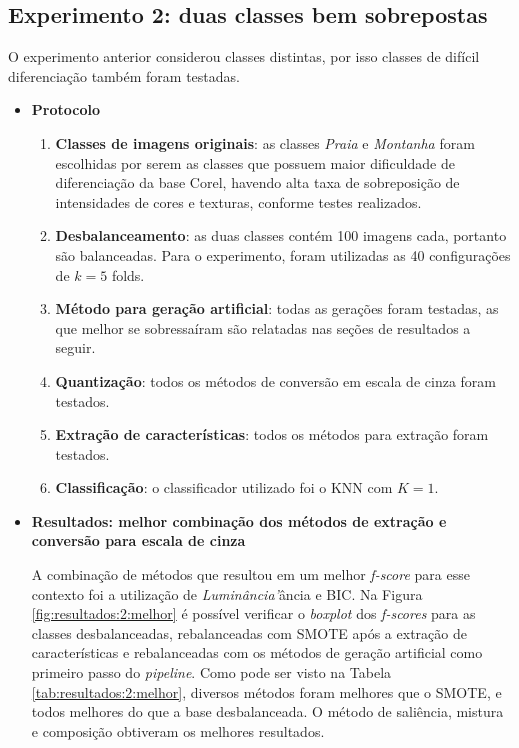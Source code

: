 \FloatBarrier
\subsection{Experimento 2: duas classes bem sobrepostas}

O experimento anterior considerou classes distintas, por isso classes de difícil diferenciação também foram testadas.

\begin{itemize}
\item[] \textbf{Protocolo}
\begin{enumerate}
\item \textbf{Classes de imagens originais}: as classes \textit{Praia} e \emph{Montanha} foram escolhidas por serem as classes que possuem maior dificuldade de diferenciação da base Corel, havendo alta taxa de sobreposição de intensidades de cores e texturas, conforme testes realizados.

\item \textbf{Desbalanceamento}: as duas classes contém 100 imagens cada, portanto são balanceadas. Para o experimento, foram utilizadas as 40 configurações de $k=5$ folds.

\item \textbf{Método para geração artificial}: todas as gerações foram testadas, as que melhor se sobressaíram são relatadas nas seções de resultados a seguir.

\item \textbf{Quantização}: todos os métodos de conversão em escala de cinza foram testados.

\item \textbf{Extração de características}: todos os métodos para extração foram testados.

\item \textbf{Classificação}: o classificador utilizado foi o KNN com $K=1$.
\end{enumerate}

\item[] \textbf{Resultados: melhor combinação dos métodos de extração e conversão para escala de cinza}

A combinação de métodos que resultou em um melhor \textit{f-score} para esse contexto foi a utilização de \emph{Luminância'}ância e BIC. Na Figura \ref{fig:resultados:2:melhor} é possível verificar o \textit{boxplot} dos \textit{f-scores} para as classes desbalanceadas, rebalanceadas com SMOTE após a extração de características e rebalanceadas com os métodos de geração artificial como primeiro passo do \textit{pipeline}. Como pode ser visto na Tabela \ref{tab:resultados:2:melhor}, diversos métodos foram melhores que o SMOTE, e todos melhores do que a base desbalanceada. O método de saliência, mistura e composição obtiveram os melhores resultados.


\end{itemize}
